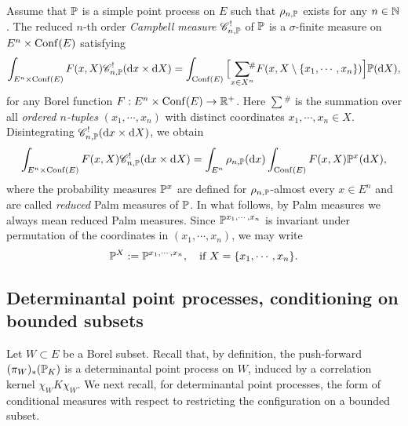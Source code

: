 \documentclass[12pt]{paper}
\numberwithin{theorem}{section}
\numberwithin{figure}{section}
\numberwithin{equation}{section}
\begin{document}
Assume that $\mathbb{P}$ is a simple point process on $E$ such that $\rho_{n, \mathbb{P}}$ exists for any $n\in\mathbb{N}$. The reduced $n$-th order {\it Campbell measure} $\mathscr{C}_{n, \mathbb{P}}^{!}$ of $\mathbb{P}$ is a $\sigma$-finite measure on $E^n \times \mathrm{Conf}(E)$ satisfying
\begin{align*}
\int_{E^n \times \mathrm{Conf}(E)}   F(x, X)  \mathscr{C}_{n, \mathbb{P}}^{!} (\mathrm{d} x \times \mathrm{d} X) =  \int_{\mathrm{Conf}(E)}  \Big[{\sum_{x \in X^n}}\!\!\!^{\#}   F(x,  X\setminus \{x_1, \cdots, x_n\}) \Big] \mathbb{P}(\mathrm{d} X),
\end{align*}
for any Borel function $F: E^n \times \mathrm{Conf}(E)\rightarrow\mathbb{R}^{+}$.  Here  ${\sum\!^{\#}}$ is the summation over all {\it ordered $n$-tuples} $(x_1, \cdots, x_n)$ with distinct coordinates $x_1, \cdots, x_n \in X$. Disintegrating $\mathscr{C}_{n, \mathbb{P}}^{!} (\mathrm{d} x \times \mathrm{d} X) $, we obtain
 \begin{align}\label{def-Palm}
\int_{E^n \times \mathrm{Conf}(E)}   F(x, X)  \mathscr{C}_{n, \mathbb{P}}^{!} (\mathrm{d} x \times \mathrm{d} X)  = \int_{E^n} \rho_{n, \mathbb{P}}(\mathrm{d} x) \int_{\mathrm{Conf}(E)}   F(x, X)   \mathbb{P}^{x} ( \mathrm{d} X),
\end{align}
where the probability measures $\mathbb{P}^x$ are defined for $\rho_{n, \mathbb{P}}$-almost every $x\in E^n$ and are called {\it reduced} Palm measures of $\mathbb{P}$. In what follows, by Palm measures we always mean reduced Palm measures. Since $\mathbb{P}^{x_1, \cdots, x_n}$ is invariant under permutation of the coordinates in $(x_1, \cdots, x_n)$, we may write
\[
\mathbb{P}^{X} := \mathbb{P}^{x_1, \cdots, x_n}, \quad \text{if $X  = \{x_1, \cdots, x_n \}$.}
\]





\subsection{Determinantal point processes, conditioning on bounded subsets}\label{sec-DPP-cond}
Let $W\subset E$ be a Borel subset. Recall that, by definition, the push-forward $(\pi_W)_{*}(\mathbb{P}_K)$ is a determinantal point process on $W$, induced by a correlation kernel $\chi_{W} K \chi_{W}$.
We next recall, for  determinantal point processes, the form of conditional measures with respect to restricting the configuration on a bounded subset.
\end{document}
